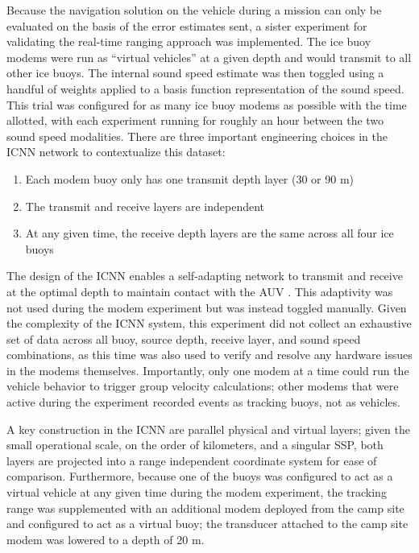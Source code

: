 Because the navigation solution on the vehicle during a mission can only be evaluated on the basis of the error estimates sent, a sister experiment for validating the real-time ranging approach was implemented.
The ice buoy modems were run as ``virtual vehicles'' at a given depth and would transmit to all other ice buoys.
The internal sound speed estimate was then toggled using a handful of weights applied to a basis function representation of the sound speed.
This trial was configured for as many ice buoy modems as possible with the time allotted, with each experiment running for roughly an hour between the two sound speed modalities.
There are three important engineering choices in the ICNN network to contextualize this dataset:
\begin{enumerate}
\item Each modem buoy only has one transmit depth layer (30 or 90 m)
\item {} The transmit and receive layers are independent
\item At any given time, the receive depth layers are the same across all four ice buoys
\end{enumerate}

The design of the ICNN enables a self-adapting network to transmit and receive at the optimal depth to maintain contact with the AUV \citep{schneider_self-adapting_2020}.
This adaptivity was not used during the modem experiment but was instead toggled manually.
Given the complexity of the ICNN system, this experiment did not collect an exhaustive set of data across all buoy, source depth, receive layer, and sound speed combinations, as this time was also used to verify and resolve any hardware issues in the modems themselves.
Importantly, only one modem at a time could run the vehicle behavior to trigger group velocity calculations; other modems that were active during the experiment recorded events as tracking buoys, not as vehicles.

 A key construction in the ICNN are parallel physical and virtual layers; given the small operational scale, on the order of kilometers, and a singular SSP, both layers are projected into a range independent coordinate system for ease of comparison.
Furthermore, because one of the buoys was configured to act as a virtual vehicle at any given time during the modem experiment, the tracking range was supplemented with an additional modem deployed from the camp site and configured to act as a virtual buoy; the transducer attached to the camp site modem was lowered to a depth of 20 m.

